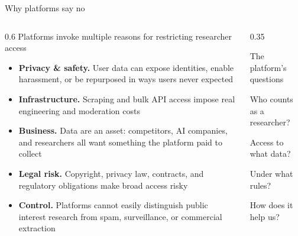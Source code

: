 \documentclass[9pt,aspectratio=169]{beamer}
\begin{document}
\begin{frame}{Why platforms say no}
    \begin{columns}[T]
        \begin{column}{0.6\textwidth}
            Platforms invoke multiple reasons for restricting researcher access

            \medskip

            \begin{itemize}\small
                \item \textbf{Privacy \& safety.} User data can expose identities, enable harassment, or be repurposed in ways users never expected
                \item \textbf{Infrastructure.} Scraping and bulk API access impose real engineering and moderation costs
                \item \textbf{Business.} Data are an asset: competitors, AI companies, and researchers all want something the platform paid to collect
                \item \textbf{Legal risk.} Copyright, privacy law, contracts, and regulatory obligations make broad access risky
                \item \textbf{Control.} Platforms cannot easily distinguish public interest research from spam, surveillance, or commercial extraction
            \end{itemize}
        \end{column}
        \begin{column}{0.35\textwidth}
            \begin{alertblock}{The platform's questions}
                \small

                Who counts as a researcher?

                \medskip
                
                Access to what data?

                \medskip
                
                Under what rules?

                \medskip

                How does it help us?
            \end{alertblock}
        \end{column}
    \end{columns}
\end{frame}
\end{document}
